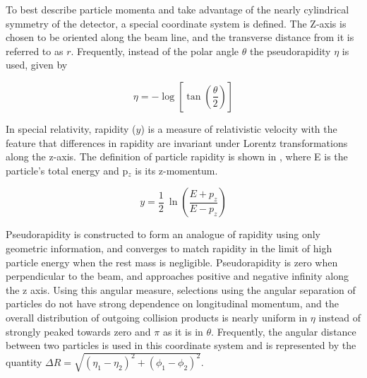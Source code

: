 To best describe particle momenta and take advantage of the nearly cylindrical symmetry of the detector, a special coordinate system is defined. 
The Z-axis is chosen to be oriented along the beam line, and the transverse distance from it is referred to as $r$. 
Frequently, instead of the polar angle $\theta$ the pseudorapidity $\eta$ is used, given by

\begin{equation}
    \label{eq:pseudo}
    \eta = - \log \left[\tan\left(\frac{\theta}{2}\right)\right]
\end{equation}

In special relativity, rapidity ($y$) is a measure of relativistic velocity with the feature that differences in rapidity are invariant under Lorentz transformations along the z-axis.
The definition of particle rapidity is shown in , where E is the particle's total energy and p$_z$ is its z-momentum.

\begin{equation}
    \label{eq:rapidity}
    y = \frac{1}{2} ~\ln \left(\frac{E+p_z}{E-p_z}\right)
\end{equation}

Pseudorapidity is constructed to form an analogue of rapidity using only geometric information, and converges to match rapidity in the limit of high particle energy when the rest mass is negligible.
Pseudorapidity is zero when perpendicular to the beam, and approaches positive and negative infinity along the z axis. 
Using this angular measure, selections using the angular separation of particles do not have strong dependence on longitudinal momentum, and the overall distribution of outgoing collision products is nearly uniform in $\eta$ instead of strongly peaked towards zero and $\pi$ as it is in $\theta$.  
Frequently, the angular distance between two particles is used in this coordinate system and is represented by the quantity $\Delta R = \sqrt{(\eta_1-\eta_2)^2+(\phi_1-\phi_2)^2}$.

